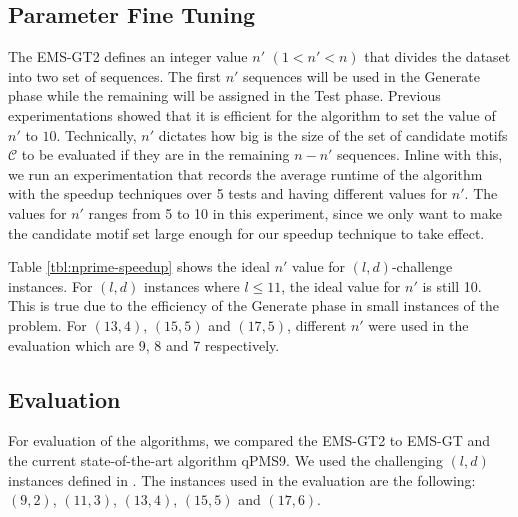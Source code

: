 \subsection{Parameter Fine Tuning}
The EMS-GT2 defines an integer value $n'$ $(1 < n' < n)$ that divides the dataset into two set of sequences. The first $n'$ sequences will be used in the Generate phase while the remaining will be assigned in the Test phase. Previous experimentations \cite{journal} showed that it is efficient for the algorithm to set the value of $n'$ to $10$. Technically, $n'$ dictates how big is the size of the set of candidate motifs $\mathcal{C}$ to be evaluated if they are in the remaining $n - n'$ sequences. Inline with this, we run an experimentation that records the average runtime of the algorithm with the speedup techniques over 5 tests and having different values for $n'$. The values for $n'$ ranges from 5 to 10 in this experiment, since we only want to make the candidate motif set large enough for our speedup technique to take effect.



Table \ref{tbl:nprime-speedup} shows the ideal $n'$ value for $(l, d)$-challenge instances. For $(l, d)$ instances where $l \leq 11$, the ideal value for $n'$ is still 10. This is true due to the efficiency of the Generate phase in small instances of the problem. For $(13, 4)$, $(15, 5)$ and $(17, 5)$, different $n'$ were used in the evaluation which are 9, 8 and 7 respectively.


\subsection{Evaluation}

For evaluation of the algorithms, we compared the EMS-GT2 to EMS-GT and the current state-of-the-art algorithm qPMS9. We used the challenging $(l, d)$ instances defined in \cite{pms2007, pms2015}. The instances used in the evaluation are the following: $(9,2)$, $(11, 3)$, $(13, 4)$, $(15, 5)$ and $(17, 6)$.


